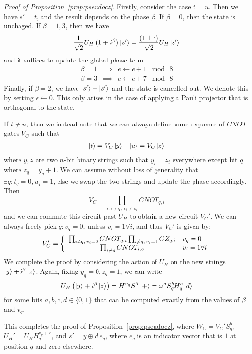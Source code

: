\begin{proof}[Proof of Proposition~\ref{prop:pseudocz}]
Firstly, consider the case $t=u$. Then we have $s'=t$, and the result depends on the phase $\beta$. If $\beta=0$, then the state is unchaged. If $\beta =1,3$, then we have
\[\frac{1}{\sqrt{2}}U_{H}\left(1+i^{\beta}\right)\ket{s'} = \frac{\left(1\pm \mathrm{i}\right)}{\sqrt{2}}U_{H}\ket{s'}\]
and it suffices to update the global phase term
\[
\begin{array}{rcl}
\beta = 1 & \implies & e\gets e+1\;\bmod\, 8\\
\beta=3 & \implies & e\gets e+7\;\bmod\,8
\end{array}\]
Finally, if $\beta=2$, we have $\ket{s'}-\ket{s'}$ and the state is cancelled out. We denote this by setting $\epsilon\gets 0$. This only arises in the case of applying a Pauli projector that is orthogonal to the state.\par
If $t\neq u$, then we instead note that we can always define some sequence of $CNOT$ gates $V_{C}$ such that
\[
\begin{array}{lr}
\ket{t}=V_{C}\ket{y} & \ket{u} = V_{C}\ket{z}
\end{array}
\]
where $y,z$ are two $n$-bit binary strings such that $y_{i}=z_{i}$ everywhere except bit $q$ where $z_{q}=y_{q} + 1$. We can assume without loss of generality that $\exists q:t_{q}=0,u_{q}=1$, else we swap the two strings and update the phase accordingly. Then
\[V_{C} = \prod_{i: i\neq q,\;t_{i}\neq u_{i}}CNOT_{q,i}\]
and we can commute this circuit past $U_{H}$ to obtain a new circuit $V_{C}'$. We can always freely pick $q:v_{q}=0$, unless $v_{i}=1\forall i$, and thus $V_{C}'$ is given by:
\[V_{C}' = \left\{ \begin{array}{c l}
\prod_{i\neq q,\,v_{i}=0} CNOT_{q,i}\prod_{i\neq q,\,v_{i}=1}CZ_{q,i} & v_{q}=0 \\ 
\prod_{i\neq q} CNOT_{i,q} & v_{i}=1 \forall i \\
\end{array} \right.
\]
We complete the proof by considering the action of $U_{H}$ on the new strings $\ket{y}+\mathrm{i}^{\beta}\ket{z}$. Again, fixing $y_{q}=0,z_{q}=1$, we can write
\[
U_{H}\left(\ket{y}+i^{\beta}\ket{z}\right) = H^{v_{q}} S^{\beta}\ket{+} = \omega^{a}S_{q}^{b}H_{q}^{c}\ket{d}
\]
for some bits $a,b,c,d\in\{0,1\}$ that can be computed exactly from the values of $\beta$ and $v_{q}$.\par
This completes the proof of Proposition~\ref{prop:pseudocz}, where $W_{C}=V_{C}'S_{q}^{b}$, $U_{H}'=U_{H}H^{v_{q}+c}_{q}$, and $s'=y\oplus d\,e_{q}$, where $e_{q}$ is an indicator vector that is $1$ at position $q$ and zero elsewhere.
\end{proof}
